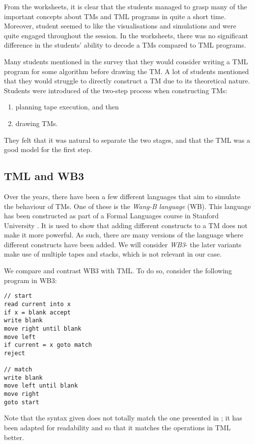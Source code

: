 From the worksheets, it is clear that the students managed to grasp many of the important concepts about TMs and TML programs in quite a short time. Moreover, student seemed to like the visualisations and simulations and were quite engaged throughout the session. In the worksheets, there was no significant difference in the students' ability to decode a TMs compared to TML programs.

Many students mentioned in the survey that they would consider writing a TML program for some algorithm before drawing the TM. A lot of students mentioned that they would struggle to directly construct a TM due to its theoretical nature. Students were introduced of the two-step process when constructing TMs:
\begin{enumerate}
    \item planning tape execution, and then
    \item drawing TMs.
\end{enumerate}
They felt that it was natural to separate the two stages, and that the TML was a good model for the first step.

\subsection{TML and WB3}
Over the years, there have been a few different languages that aim to simulate the behaviour of TMs. One of these is the \emph{Wang-B language} (WB). This language has been constructed as part of a Formal Languages course in Stanford University \citep{stanford_WB}. It is used to show that adding different constructs to a TM does not make it more powerful. As such, there are many versions of the language where different constructs have been added. We will consider \emph{WB3}- the later variants make use of multiple tapes and stacks, which is not relevant in our case.

We compare and contrast WB3 with TML. To do so, consider the following program in WB3:
\begin{lstlisting}[language=WB]
// start
read current into x
if x = blank accept
write blank
move right until blank
move left
if current = x goto match
reject

// match
write blank
move left until blank
move right
goto start
\end{lstlisting}
Note that the syntax given does not totally match the one presented in \citet{stanford_WB}; it has been adapted for readability and so that it matches the operations in TML better.

